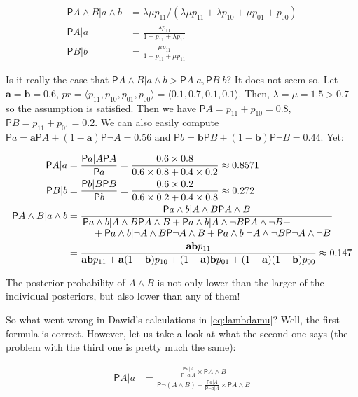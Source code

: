 \documentclass[10pt,dvipsnames,enabledeprecatedfontcommands]{scrartcl}
\newcommand{\ra}{\rangle}
\newcommand{\la}{\langle}
\newcommand{\n}{\neg}
\newcommand{\et}{\wedge}
\newcommand{\pr}{\mathsf{P}}
\begin{document}
\begin{align}\label{eq:lambdamu}
 \pr{A\et B\vert  a\et b} &= \lambda \mu p_{11}/(\lambda \mu p_{11} + \lambda p_{10} +\mu p_{01} + p_{00})\\
 \pr{A\vert a} & = \frac{\lambda p_{11}}{1-p_{11}+\lambda p_{11}}\nonumber \\
 \pr{B\vert b} & = \frac{\mu p_{11}}{1-p_{11}+\mu p_{11}} \nonumber 
 \end{align}

\noindent Is it really the case that
\(\pr{A\et B\vert a\et b}>\pr{A\vert a},\pr{B\vert b}\)? It does not
seem so. Let \(\mathbf{a}=\mathbf{b}=0.6\),
\(pr =\la p_{11},p_{10},p_{01},p_{00}\ra=\la 0.1, 0.7, 0.1, 0.1 \ra\).
Then, \(\lambda=\mu=1.5>0.7\) so the assumption is satisfied. Then we
have \(\pr{A}=p_{11}+p_{10}=0.8\), \(\pr{B}=p_{11}+p_{01}=0.2\). We can
also easily compute
\(\pr{a}=\mathbf{a}\pr{A}+(1-\mathbf{a})\pr{\n A}=0.56\) and
\(\pr{b}=\mathbf{b}\pr{B}+(1-\mathbf{b})\pr{\n B}=0.44\). Yet:

\begin{align*}
 \pr{A\vert a} & = \frac{\pr{a\vert A}\pr{A}}{\pr{a}} = \frac{0.6\times 0.8}{0.6\times 0.8 + 0.4\times 0.2}\approx 0.8571 \\
 \pr{B\vert b} & = \frac{\pr{b\vert B}\pr{B}}{\pr{b}} = \frac{0.6\times 0.2}{0.6\times 0.2 + 0.4\times 0.8}\approx 0.272 \\
 \pr{A\et B \vert a \et b} & = \frac{\pr{a\et b\vert A \et B}\pr{A\et B}}{\splitfrac{\pr{a\et b \vert A\et B}\pr{A\et B}+
   \pr{a\et b\vert A\et \n B}\pr{A\et \n B} +}{+ 
 \pr{a\et b \vert \n A \et B}\pr{\n A \et B} + \pr{a\et b \vert \n A \et \n B}\pr{\n A \et \n B}}} \\
 & = \frac{\mathbf{ab}p_{11}}{
   \mathbf{ab}p_{11} + \mathbf{a}(1-\mathbf{b})p_{10} + (1-\mathbf{a})\mathbf{b}p_{01} + (1-\mathbf{a})(1-\mathbf{b})p_{00}
 }  
    \approx 0.147
 \end{align*}

The posterior probability of \(A\et B\) is not only lower than the
larger of the individual posteriors, but also lower than any of them!

So what went wrong in Dawid's calculations in \eqref{eq:lambdamu}? Well,
the first formula is correct. However, let us take a look at what the
second one says (the problem with the third one is pretty much the
same):

\begin{align*}
\pr{A\vert a } & = \frac{\frac{\pr{a\vert A}}{\pr{\n a \vert A}}\times \pr{A\et B}}{\pr{\n (A\et B)}+ \frac{\pr{a\vert A}}{\pr{\n a \vert A}} \times \pr{A\et B}}
\end{align*}
\end{document}
